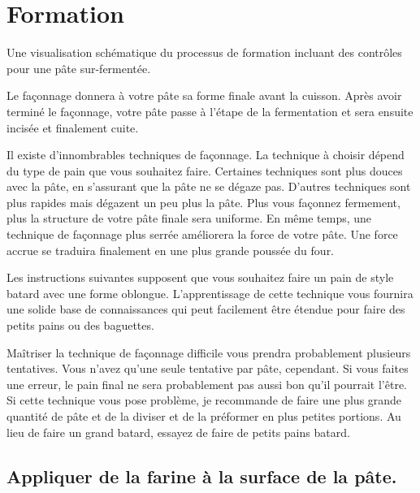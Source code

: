 \section{Formation}

\begin{flowchart}[!htb]
\begin{center}
  
  \caption[Processus de formation]{Une visualisation schématique du processus de formation
      incluant des contrôles pour une pâte sur-fermentée.}%
  \label{fig:shaping-decision-tree}
\end{center}
\end{flowchart}Le façonnage donnera à votre pâte sa forme finale avant la cuisson. Après
avoir terminé le façonnage, votre pâte passe à l'étape de la fermentation et
sera ensuite incisée et finalement cuite.

Il existe d'innombrables techniques de façonnage. La technique à choisir
dépend du type de pain que vous souhaitez faire. Certaines techniques
sont plus douces avec la pâte, en s'assurant que la pâte ne se dégaze pas.
D'autres techniques sont plus rapides mais dégazent un peu plus la pâte.
Plus vous façonnez fermement, plus la structure de votre pâte finale sera uniforme.
En même temps, une technique de façonnage plus serrée
améliorera la force de votre pâte. Une force accrue se traduira finalement
en une plus grande poussée du four.

Les instructions suivantes supposent que vous souhaitez faire un pain
de style batard avec une forme oblongue. L'apprentissage de cette technique
vous fournira une solide base de connaissances qui
peut facilement être étendue pour faire des petits pains ou des baguettes.

Maîtriser la technique de façonnage difficile vous prendra
probablement plusieurs tentatives. Vous n'avez qu'une seule tentative par pâte, cependant. Si vous
faites une erreur, le pain final ne sera probablement pas aussi bon
qu'il pourrait l'être. Si cette technique vous pose problème, je recommande de faire
une plus grande quantité de pâte et de la diviser et de la préformer en
plus petites portions. Au lieu de faire un grand batard, essayez de faire de petits
pains batard.

\subsection[Saupoudrage de la surface]{Appliquer de la farine à la surface de la pâte.}

